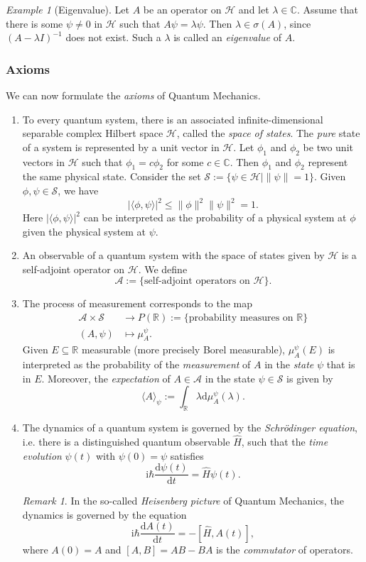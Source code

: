 \documentclass[12pt]{amsart}
\numberwithin{equation}{section}
\theoremstyle{plain}
\theoremstyle{definition}
\theoremstyle{remark}
\newtheorem{rem}{Remark}[subsection]
\newtheorem{ex}{Example}[subsection]
\newcommand{\R}{\mathbb{R}}
\newcommand{\dd}{{\mathrm{d}}}
\newcommand{\calA}{\mathcal{A}}
\newcommand{\calH}{\mathcal{H}}
\newcommand{\calS}{\mathcal{S}}
\newcommand{\I}{\mathrm{i}}
\begin{document}
\begin{ex}[Eigenvalue]
Let $A$ be an operator on $\calH$ and let $\lambda\in\mathbb{C}$. Assume that there is some $\psi\not=0$ in $\calH$ such that $A\psi=\lambda\psi$. Then $\lambda\in\sigma(A)$, since $(A-\lambda I)^{-1}$ does not exist. Such a $\lambda$ is called an \emph{eigenvalue} of $A$.
\end{ex}

\subsubsection{Axioms} We can now formulate the \emph{axioms} of Quantum Mechanics. 
\begin{enumerate}[(QM1)]
\item{To every quantum system, there is an associated infinite-dimensional separable complex Hilbert space $\calH$, called the \emph{space of states}. The \emph{pure} state of a system is represented by a unit vector in $\calH$. Let $\phi_1$ and $\phi_2$ be two unit vectors in $\calH$ such that $\phi_1=c\phi_2$ for some $c\in\mathbb{C}$. Then $\phi_1$ and $\phi_2$ represent the same physical state. Consider the set $\calS:=\{\psi\in\calH\mid\|\psi\|=1\}$. Given $\phi,\psi\in\calS$, we have $$\vert\langle\phi,\psi\rangle\vert^2\leq \|\phi\|^2\|\psi\|^2=1.$$
Here $\vert\langle\phi,\psi\rangle\vert^2$ can be interpreted as the probability of a physical system at $\phi$ given the physical system at $\psi$.
}
\item{An observable of a quantum system with the space of states given by $\calH$ is a self-adjoint operator on $\calH$. We define 
\[
\calA:=\{\text{self-adjoint operators on $\calH$}\}.
\]
}
\item{The process of measurement corresponds to the map 
\begin{align*}
\calA\times\calS&\to P(\R):=\{\text{probability measures on $\R$}\}\\
(A,\psi)&\mapsto \mu_A^\psi.
\end{align*}
Given $E\subseteq\R$ measurable (more precisely Borel measurable), $\mu_A^\psi(E)$ is interpreted as the probability of the \emph{measurement} of $A$ in the \emph{state} $\psi$ that is in $E$. Moreover, the \emph{expectation} of $A\in\calA$ in the state $\psi\in\calS$ is given by 
$$\langle A\rangle_\psi:=\int_\R\lambda \dd\mu_A^\psi(\lambda).$$
}
\item{The dynamics of a quantum system is governed by the \emph{Schr\"odinger equation}, i.e. there is a distinguished quantum observable $\widehat{H}$, such that the \emph{time evolution} $\psi(t)$ with $\psi(0)=\psi$ satisfies
$$\I\hbar\frac{\dd\psi(t)}{\dd t}=\widehat{H}\psi(t).$$
\begin{rem}
In the so-called \emph{Heisenberg picture} of Quantum Mechanics, the dynamics is governed by the equation $$\I\hbar \frac{\dd A(t)}{\dd t}=-[\widehat{H},A(t)],$$
where $A(0)=A$ and $[A,B]=AB-BA$ is the \emph{commutator} of operators.
\end{rem}
}
\end{enumerate}
\end{document}
